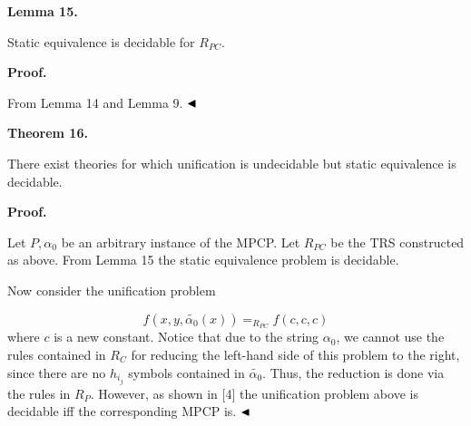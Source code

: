  
 
\par\medskip\noindent\textbf{Lemma 15.}\par
 
 
Static equivalence is decidable for $R_{PC}$.\par
 
 
 
 
 
\par\medskip\noindent\textbf{Proof.}\par
 
 
From Lemma 14 and Lemma 9. $\hfill\blacktriangleleft$\par
 
 
 
\par\medskip\noindent\textbf{Theorem 16.}\par
 
 
There exist theories for which unification is undecidable but static equivalence is decidable.\par
 
 
 
 
 
\par\medskip\noindent\textbf{Proof.}\par
 
 
Let $P,\alpha_{0}$ be an arbitrary instance of the MPCP. Let $R_{PC}$ be the TRS constructed as above. From Lemma 15 the static equivalence problem is decidable.\par
 
 
 
Now consider the unification problem\par
    \[f(x,y,\widetilde{\alpha_{0}}(x))=_{R_{PC}}f(c,c,c)\]    
where $c$ is a new constant. Notice that due to the string $\alpha_{0}$, we cannot use the rules contained in $R_{C}$ for reducing the left-hand side of this problem to the right, since there are no $h_{i_{j}}$ symbols contained in $\widetilde{\alpha_{0}}$. Thus, the reduction is done via the rules in $R_{P}$. However, as shown in [4] the unification problem above is decidable iff the corresponding MPCP is. $\hfill\blacktriangleleft$\par
 
